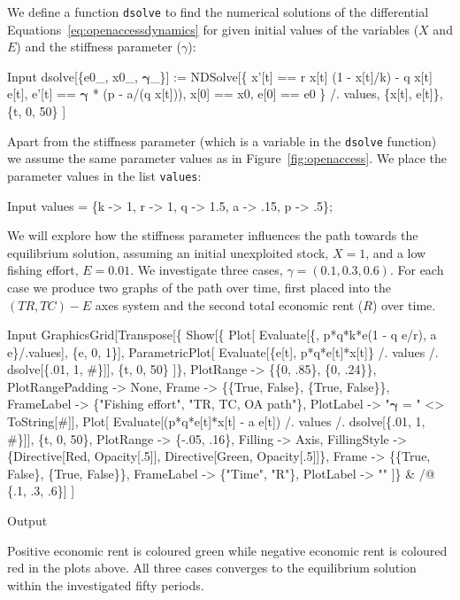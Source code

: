 \documentclass[11pt,fleqn]{book} %
\begin{document}
\begin{theorem}
\hfill \break
We define a function \texttt{dsolve} to find the numerical solutions of the differential Equations~\ref{eq:openaccessdynamics} for given initial values of the variables ($X$ and $E$) and the stiffness parameter ($\gamma$):
\begin{mmaCell}[index=1]{Input}
  dsolve[\{e0_, x0_, \(\pmb{\gamma}\)_\}] := NDSolve[\{
    x'[t] == r x[t] (1 - x[t]/k) - q  x[t] e[t],
    e'[t] == \(\pmb{\gamma}\) * (p - a/(q x[t])),
    x[0]  == x0,
    e[0]  == e0
    \} /. values,
    \{x[t], e[t]\}, \{t, 0, 50\}
  ]
\end{mmaCell}
Apart from the stiffness parameter (which is a variable in the \texttt{dsolve} function) we assume the same parameter values as in Figure~\ref{fig:openaccess}. We place the parameter values in the list \texttt{values}:
\begin{mmaCell}{Input}
  values = \{k -> 1, r -> 1, q -> 1.5, a -> .15, p -> .5\};
\end{mmaCell}
We will explore how the stiffness parameter influences the path towards the equilibrium solution, assuming an initial unexploited stock, $X = 1$, and a low fishing effort, $E = 0.01$. We investigate three cases, $\gamma = (0.1, 0.3, 0.6)$. For each case we produce two graphs of the path over time, first placed into the $(TR, TC) - E$ axes system and the second total economic rent ($R$) over time.
\begin{mmaCell}{Input}
  GraphicsGrid[Transpose[\{
    Show[\{
      Plot[
        Evaluate[\{, p*q*k*e(1 - q e/r), a e\}/.values], \{e, 0, 1\}],
      ParametricPlot[
        Evaluate[\{e[t], p*q*e[t]*x[t]\} /. values /. 
          dsolve[\{.01, 1, #\}]], \{t, 0, 50\}
        ]\}, 
        PlotRange        -> \{\{0, .85\}, \{0, .24\}\}, 
        PlotRangePadding -> None,
        Frame            -> \{\{True, False\}, \{True, False\}\},
        FrameLabel       -> \{"Fishing effort", "TR, TC, OA path"\},
        PlotLabel        -> "\(\pmb{\gamma}\) = " <> ToString[#]],
      Plot[
        Evaluate[(p*q*e[t]*x[t] - a e[t]) /. values /. 
          dsolve[\{.01, 1, #\}]], \{t, 0, 50\},
        PlotRange    -> \{-.05, .16\}, Filling -> Axis,
        FillingStyle -> \{Directive[Red, Opacity[.5]], 
          Directive[Green, Opacity[.5]]\},
        Frame        -> \{\{True, False\}, \{True, False\}\},
        FrameLabel   -> \{"Time", "R"\}, 
        PlotLabel    -> ""
      ]\} & /@ \{.1, .3, .6\}]
    ]
\end{mmaCell}
\begin{mmaCell}[moregraphics={moreig={scale=.6}}]{Output}
\end{mmaCell}
Positive economic rent is coloured green while negative economic rent is coloured red in the plots above. All three cases converges to the equilibrium solution within the investigated fifty periods.


\end{theorem}
\end{document}
